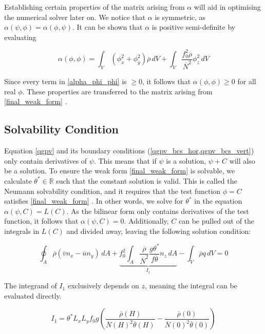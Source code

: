 \documentclass{article}
\begin{document}
Establishing certain properties of the matrix arising from $\alpha$ will aid in optimising the numerical solver later on.
We notice that $\alpha$ is symmetric, as $\alpha(\psi, \phi) = \alpha(\phi, \psi)$.
It can be shown that $\alpha$ is positive semi-definite by evaluating

\begin{equation}\label{alpha_phi_phi}
    \alpha(\phi, \phi) = \int_V {\,(\phi_x^2 + \phi_y^2) \overline\rho \, dV} + \int_V {\frac{ f_0^2\overline \rho}{\overline N^2} \phi_z^2 \,dV}
\end{equation}

Since every term in \cref{alpha_phi_phi} is $\geq 0$, it follows that $\alpha (\phi,\phi) \geq 0$ for all real $\phi$.
These properties are transferred to the matrix arising from \cref{final_weak_form} \cite{larson2013finite}.

\subsection{Solvability Condition}\label{sec:solv_cond}

Equation \eqref{qgpv} and its boundary conditions (\cref{qgpv_bcs_hor,qgpv_bcs_vert}) only contain derivatives of $\psi$. This means that if $\psi$ is a solution, $\psi + C$ will also be a solution.
To ensure the weak form \eqref{final_weak_form} is solvable, we calculate $\theta^* \in \mathbb{R}$ such that the constant solution is valid.
This is called the Neumann solvability condition, and it requires that the test function $\phi=C$ satisfies \cref{final_weak_form} \cite{larson2013finite}.
In other words, we solve for $\theta ^*$ in the equation $\alpha(\psi, C) = L(C)$.
As the bilinear form only contains derivatives of the test function, it follows that $\alpha(\psi, C)=0$.
Additionally, $C$ can be pulled out of the integrals in $L(C)$ and divided away, leaving the following solution condition:

\begin{equation}\label{solve_cond_1}
    \oint_A {\overline \rho \left( \overline v n_x -  \overline u n_y\right)\,dA}
    + \underbrace{f_0^2\int _A {\frac{\overline \rho}{\overline N^2} \frac{g\theta ^*}{f\overline{\theta}} n_z \, dA}}_{I_1}
    - \int_V { \overline\rho q  \,dV} = 0
\end{equation}

The integrand of $I_1$ exclusively depends on $z$, meaning the integral can be evaluated directly.

\begin{equation}
    I_1 = \theta ^*L_x L_y f_0 g \left(\frac{\overline \rho (H)}{\overline N(H)^2 \overline \theta(H) } - \frac{\overline \rho (0)}{\overline N(0)^2 \overline \theta(0) }\right)
\end{equation}
\end{document}
